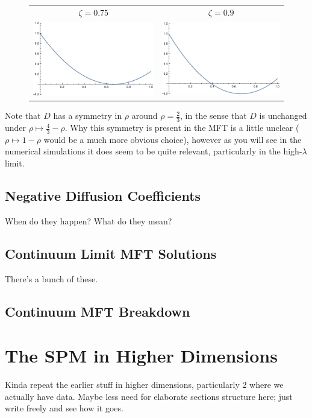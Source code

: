 \begin{figure}[h!]
\begin{center}
\begin{tabular}{c c}
     $\zeta = 0.75$  & $\zeta = 0.9$ \\
     \includegraphics[width=0.49\linewidth]{analytics/images/diffCoeffs/diffCoeff-0-75}  & \includegraphics[width=0.49 \linewidth]{analytics/images/diffCoeffs/diffCoeff-0-9} \\
    \end{tabular}
\end{center}
    \vspace{-2em}
\end{figure}
Note that $D$ has a symmetry in $\rho$ around $\rho = \frac{2}{3}$, in the sense that $D$ is unchanged under $\rho \mapsto \frac{4}{3} - \rho$. Why this symmetry is present in the MFT is a little unclear ($\rho \mapsto 1 - \rho$
would be a much more obvious choice), however as you will see in the numerical simulations it does seem to be quite relevant, particularly in the high-$\lambda$ limit.

\subsection{Negative Diffusion Coefficients}
When do they happen? What do they mean?
\subsection{Continuum Limit MFT Solutions}
There's a bunch of these.
\subsection{Continuum MFT Breakdown}

\section{The SPM in Higher Dimensions}
Kinda repeat the earlier stuff in higher dimensions, particularly 2 where we actually have data. Maybe less need for elaborate sections structure here; just write freely and see how it goes.

